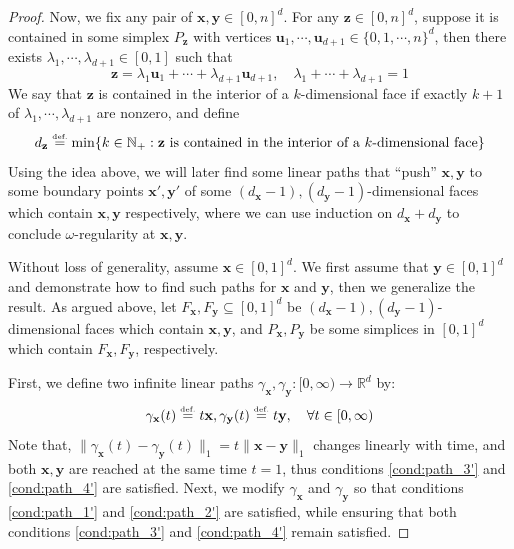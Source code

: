 \documentclass{article}
\numberwithin{equation}{section}
\theoremstyle{definition}
\newcommand{\eqdef}{\ensuremath{\stackrel{\mbox{\upshape\tiny def.}}{=}}}
\begin{document}
\begin{proof}
Now, we fix any pair of $\mathbf{x},\mathbf{y}\in [0,n]^d$. 
For any $\mathbf{z}\in [0,n]^d$, suppose it is contained in some simplex $P_{\mathbf{z}}$ with vertices $\mathbf{u}_1,\cdots,\mathbf{u}_{d+1}\in \{0,1,\cdots,n\}^d$, then there exists $\lambda_1,\cdots,\lambda_{d+1}\in[0,1]$ such that
$$\mathbf{z} = \lambda_1 \mathbf{u}_1 + \cdots + \lambda_{d+1} \mathbf{u}_{d+1}, \quad
\lambda_1 + \cdots + \lambda_{d+1} = 1$$
We say that $\mathbf{z}$ is contained in the interior of a $k$-dimensional face if exactly $k+1$ of $\lambda_1,\cdots,\lambda_{d+1}$ are nonzero, and define
\[
        d_{\mathbf{z}}  
    \eqdef  
        \min 
        \{ 
            k\in\mathbb{N}_+ : 
            \mathbf{z} \text{ is contained in the interior of a $k$-dimensional face}
        \}
\]
Using the idea above, we will later find some linear paths that ``push'' $\mathbf{x},\mathbf{y}$ to 
some boundary points $\mathbf{x}',\mathbf{y}'$ of some $(d_{\mathbf{x}}-1),(d_{\mathbf{y}}-1)$-dimensional faces which contain $\mathbf{x},\mathbf{y}$ respectively, where we can use induction on $d_{\mathbf{x}} + d_{\mathbf{y}}$
to conclude $\omega$-regularity at $\mathbf{x},\mathbf{y}$.

Without loss of generality, assume $\mathbf{x}\in [0,1]^d$. We first assume that $\mathbf{y}\in [0,1]^d$ and demonstrate how to find such paths for $\mathbf{x}$ and $\mathbf{y}$, then we generalize the result. 
As argued above, let $F_{\mathbf{x}},F_{\mathbf{y}}\subseteq[0,1]^d$ be $(d_{\mathbf{x}}-1),(d_{\mathbf{y}}-1)$-dimensional faces which contain $\mathbf{x},\mathbf{y}$, and $P_{\mathbf{x}},P_{\mathbf{y}}$ be some simplices in $[0,1]^d$ which contain $F_{\mathbf{x}},F_{\mathbf{y}}$, respectively. 

First, we define two infinite linear paths $\gamma_{\mathbf{x}},\gamma_{\mathbf{y}}: [0,\infty) \rightarrow \mathbb{R}^d$ by:
$$\gamma_{\mathbf{x}}(t)  \eqdef  t\mathbf{x}, \gamma_{\mathbf{y}}(t)  \eqdef  t\mathbf{y}, \quad \forall t\in[0,\infty)$$
Note that, $\|\gamma_{\mathbf{x}}(t) - \gamma_{\mathbf{y}}(t)\|_1 = t\|\mathbf{x} - \mathbf{y}\|_1$ changes linearly with time, and both $\mathbf{x}, \mathbf{y}$ are reached at the same time $t=1$, thus conditions \ref{cond:path_3'} and \ref{cond:path_4'} are satisfied. Next, we modify $\gamma_{\mathbf{x}}$ and $\gamma_{\mathbf{y}}$ so that conditions \ref{cond:path_1'} and \ref{cond:path_2'} are satisfied, while ensuring that both conditions \ref{cond:path_3'} and \ref{cond:path_4'} remain satisfied.


\end{proof}
\end{document}
